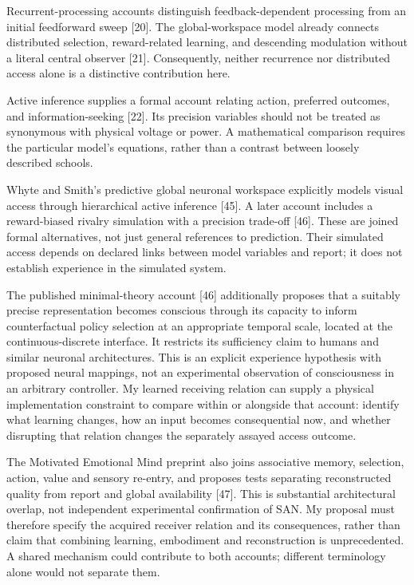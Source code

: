\documentclass[
  american,
  11pt,
  letterpaper,
]{article}
\begin{document}
Recurrent-processing accounts distinguish feedback-dependent processing from an initial feedforward sweep {[}20{]}. The global-workspace model already connects distributed selection, reward-related learning, and descending modulation without a literal central observer {[}21{]}. Consequently, neither recurrence nor distributed access alone is a distinctive contribution here.

Active inference supplies a formal account relating action, preferred outcomes, and information-seeking {[}22{]}. Its precision variables should not be treated as synonymous with physical voltage or power. A mathematical comparison requires the particular model's equations, rather than a contrast between loosely described schools.

Whyte and Smith's predictive global neuronal workspace explicitly models visual access through hierarchical active inference {[}45{]}. A later account includes a reward-biased rivalry simulation with a precision trade-off {[}46{]}. These are joined formal alternatives, not just general references to prediction. Their simulated access depends on declared links between model variables and report; it does not establish experience in the simulated system.

The published minimal-theory account {[}46{]} additionally proposes that a suitably precise representation becomes conscious through its capacity to inform counterfactual policy selection at an appropriate temporal scale, located at the continuous-discrete interface. It restricts its sufficiency claim to humans and similar neuronal architectures. This is an explicit experience hypothesis with proposed neural mappings, not an experimental observation of consciousness in an arbitrary controller. My learned receiving relation can supply a physical implementation constraint to compare within or alongside that account: identify what learning changes, how an input becomes consequential now, and whether disrupting that relation changes the separately assayed access outcome.

The Motivated Emotional Mind preprint also joins associative memory, selection, action, value and sensory re-entry, and proposes tests separating reconstructed quality from report and global availability {[}47{]}. This is substantial architectural overlap, not independent experimental confirmation of SAN. My proposal must therefore specify the acquired receiver relation and its consequences, rather than claim that combining learning, embodiment and reconstruction is unprecedented. A shared mechanism could contribute to both accounts; different terminology alone would not separate them.
\end{document}
